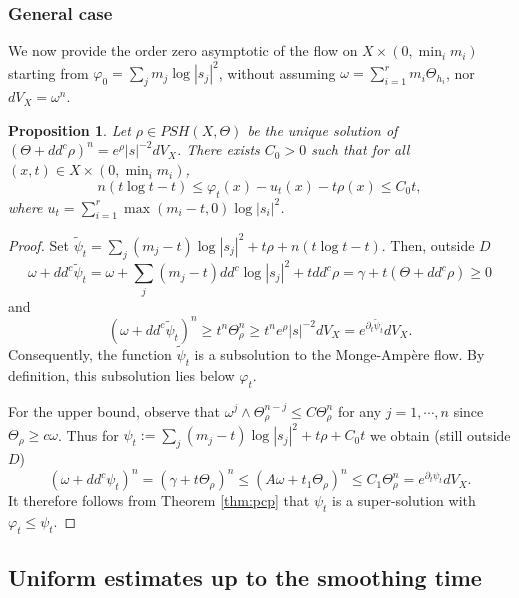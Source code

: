 \documentclass[10pt,a4paper]{amsart}
\numberwithin{equation}{section}
\newtheorem{prop}[theorem]{Proposition}
\newcommand{\f}{\varphi}
\begin{document}
\subsubsection{General case}

We now provide  the order zero asymptotic of the flow on $X \times (0,\min_i m_i)$ starting from $\varphi_0=\sum_j m_j \log|s_j|^2 $, without assuming  $\omega=\sum_{i=1}^r m_i \Theta_{h_i}$, nor $dV_X=\omega^n$.



\begin{prop} \label{prop:0uniform1}
Let $\rho \in PSH(X,\Theta)$ be the unique
solution of $(\Theta+dd^c \rho)^n =e^{\rho} |s|^{-2} dV_X$.
 There exists $C_0>0$ such that  
for all $(x,t) \in X \times (0,\min_i m_i)$,
$$
n(t\log t-t) \leq \f_t(x) - u_t(x) -t\rho(x) \leq   C_0 t,
$$
where $u_t=\sum_{i=1}^r \max(m_i-t,0) \log|s_i|^2$. 
\end{prop}

 

\begin{proof}
 Set $\tilde{\psi}_t=  \sum_j (m_j-t) \log|s_j|^2+t \rho+n(t\log t-t) $. Then, outside $D$
 $$\omega+ dd^c \tilde{\psi}_t = \omega+ \sum_j (m_j-t) dd^c \log |s_j|^2 +t dd^c \rho= \gamma +t(\Theta+dd^c \rho) \geq 0 $$ and
$$
		(\omega+dd^c \tilde{\psi}_t)^n \geq    t^n \Theta_\rho^n
		\geq t^n e^{\rho} |s|^{-2} dV_X = e^{\partial_t \tilde{\psi}_t} dV_X.
$$
	Consequently, the function $\tilde{\psi}_t$ is a subsolution to the Monge-Amp\`ere flow. By definition, this subsolution lies below $\varphi_t$.  
	
\smallskip

For the upper bound,   observe that  $\omega^j \wedge \Theta_{\rho}^{n-j} \leq C \Theta_{\rho}^n$ for any $j=1, \cdots, n$
since $\Theta_{\rho} \geq c \omega$. 
Thus for $\psi_t:= \sum_j(m_j-t) \log |s_j|^2+t\rho+C_0t $ we obtain (still outside $D$)
$$	
(\omega+dd^c {\psi}_t)^n =  \left ( \gamma+   t\Theta_\rho \right) ^n 
\leq \left ( A\omega+   t_1\Theta_\rho \right)^n \leq C_1 \Theta_\rho^n =e^{\partial_t \psi_t} dV_X. 
$$
It therefore follows  from Theorem \ref{thm:pcp}  that $\psi_t$ is a super-solution with $\f_t \leq \psi_t$.
\end{proof}
 


  




\subsection{Uniform estimates up to the smoothing time}
\end{document}
